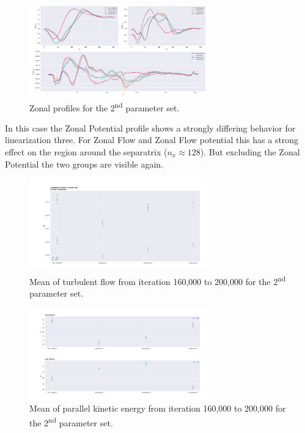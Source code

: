\documentclass[master.tex]{subfiles}
\begin{document}
\begin{figure}[!hbtp]
    \includegraphics[width=\linewidth, height=150px]{pdfs/0-4_0-06/zonal_profiles.pdf}
    \caption{Zonal profiles for the 2\textsuperscript{nd} parameter set.}
    \label{fig:zonal_profiles-high_good}
\end{figure}

In this case the Zonal Potential profile shows a strongly differing behavior for linearization three. For Zonal Flow and Zonal Flow potential this has a strong effect on the region around the separatrix ($n_x\approx 128$). But excluding the Zonal Potential the two groups are visible again.

\begin{figure}[!hbtp]
    \includegraphics[width=\linewidth, height=150px]{pdfs/0-4_0-06/turbulent_flow_means.pdf}
    \caption{Mean of turbulent flow from iteration 160,000 to 200,000 for the 2\textsuperscript{nd} parameter set.}
    \label{fig:turbulent-flow-means-high_good}
\end{figure}

\begin{figure}[!hbtp]
    \includegraphics[width=\linewidth, height=150px]{pdfs/0-4_0-06/velocity_energy_means.pdf}
    \caption{Mean of parallel kinetic energy from iteration 160,000 to 200,000 for the 2\textsuperscript{nd} parameter set.}
    \label{fig:velocity-energy-means-high_good}
\end{figure}
\end{document}
